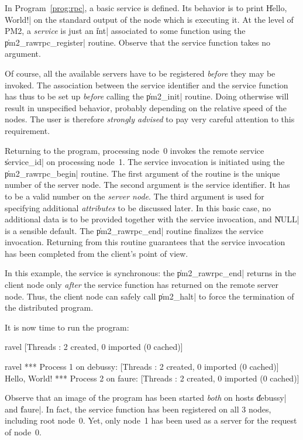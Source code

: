 In Program~\ref{prog:rpc}, a basic service is defined. Its behavior is
to print \|Hello, World!| on the standard output of the node which is
executing it. At the level of PM2, a \emph{service} is just an \|int|
associated to some function using the \|pm2_rawrpc_register| routine.
Observe that the service function takes no argument.

Of course, all the available servers have to be registered
\emph{before} they may be invoked. The association between the service
identifier and the service function has thus to be set up
\emph{before} calling the \|pm2_init| routine. Doing otherwise will
result in unspecified behavior, probably depending on the relative
speed of the nodes. The user is therefore \emph{strongly advised} to
pay very careful attention to this requirement.

Returning to the program, processing node~0 invokes the remote service
\|service_id| on processing node~1. The service invocation is
initiated using the \|pm2_rawrpc_begin| routine.  The first argument
of the routine is the unique number of the server node.  The second
argument is the service identifier. It has to be a valid number on the
\emph{server node}.  The third argument is used for specifying
additional \emph{attributes} to be discussed later. In this basic
case, no additional data is to be provided together with the service
invocation, and \|NULL| is a sensible default. The \|pm2_rawrpc_end|
routine finalizes the service invocation. Returning from this routine
guarantees that the service invocation has been completed from the
client's point of view.

In this example, the service is synchronous: the \|pm2_rawrpc_end|
returns in the client node only \emph{after} the service function has
returned on the remote server node. Thus, the client node can safely
call \|pm2_halt| to force the termination of the distributed program.

It is now time to run the program:
\begin{shell}
ravel%
[Threads : 2 created, 0 imported (0 cached)]

ravel%
*** Process 1 on debussy:
[Threads : 2 created, 0 imported (0 cached)]
Hello, World!
*** Process 2 on faure:
[Threads : 2 created, 0 imported (0 cached)]
\end{shell}
Observe that an image of the program has been started \emph{both} on
hosts \|debussy| and \|faure|. In fact, the service function has been
registered on all 3 nodes, including root node~0.  Yet, only 
node~1 has been used as a server for the request of node~0.

